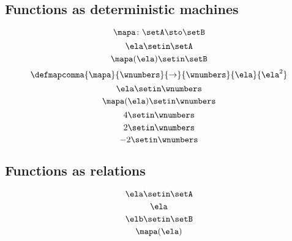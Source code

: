 {\begin{forslides}
    \subsection{Functions as deterministic machines}

    \begin{equation}
        \label{eq:slides_session2_94}
        \mapa\colon \setA \sto \setB
    \end{equation}
    \begin{equation}
        \label{eq:slides_session2_95}
        \ela \setin\setA
    \end{equation}
    \begin{equation}
        \label{eq:slides_session2_96}
        \mapa(\ela) \setin\setB
    \end{equation}
    \begin{equation}
        \label{eq:slides_session2_97}
        \defmapcomma{
            \mapa
        }{
            \wnumbers
        }{
            \to
        }{
            \wnumbers
        }{
            \ela
        }{
            \ela^2
        }
    \end{equation}
    \begin{equation}
        \label{eq:slides_session2_98}
        \ela \setin\wnumbers
    \end{equation}
    \begin{equation}
        \label{eq:slides_session2_99}
        \mapa(\ela) \setin\wnumbers
    \end{equation}
    \begin{equation}
        \label{eq:slides_session2_100}
        4 \setin\wnumbers
    \end{equation}
    \begin{equation}
        \label{eq:slides_session2_101}
        2 \setin\wnumbers
    \end{equation}
    \begin{equation}
        \label{eq:slides_session2_102}
        -2 \setin\wnumbers
    \end{equation}

    \subsection{Functions as relations}

    \begin{equation}
        \label{eq:slides_session2_103}
        \ela \setin\setA
    \end{equation}
    \begin{equation}
        \label{eq:slides_session2_104}
        \ela
    \end{equation}
    \begin{equation}
        \label{eq:slides_session2_105}
        \elb \setin \setB
    \end{equation}
    \begin{equation}
        \label{eq:slides_session2_106}
        \mapa(\ela)
    \end{equation}


\end{forslides}}

